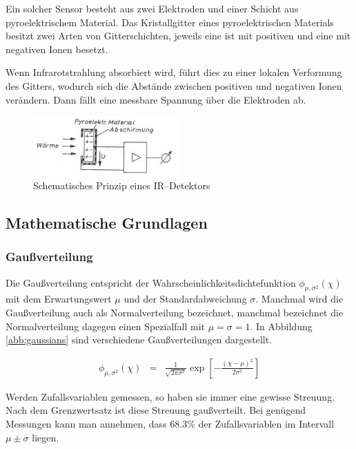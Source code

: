 \documentclass[12pt,a4paper]{scrartcl}
\numberwithin{equation}{section} %
\begin{document}
Ein solcher Sensor besteht aus zwei Elektroden und einer Schicht aus pyroelektrischem Material. Das Kristallgitter eines pyroelektrischen Materials besitzt zwei Arten von Gitterschichten, jeweils eine ist mit positiven und eine mit negativen Ionen besetzt. \cite{pyroelektrischer Sensor}

Wenn Infrarotstrahlung absorbiert wird, führt dies zu einer lokalen Verformung des Gitters, wodurch sich die Abstände zwischen positiven und negativen Ionen verändern. Dann fällt eine messbare Spannung über die Elektroden ab.

\begin{figure}[h!]
  \centering
  \includegraphics[width=0.5\textwidth]{../media/B1.1/IR_Sensor.jpg}
  \caption{Schematisches Prinzip eines IR--Detektors \cite{pyroelektrischer Sensor}}
  \label{abb:pyroelektrischer Sensor}
\end{figure}

\hypertarget{mathematische-grundlagen}{%
\subsection{Mathematische Grundlagen}\label{mathematische-grundlagen}}

\hypertarget{gauuxdfverteilung}{%
\subsubsection{Gaußverteilung}\label{gauuxdfverteilung}}

Die Gaußverteilung entspricht der Wahrscheinlichkeitsdichtefunktion $\phi_{\mu,\sigma^2}(\chi)$ mit dem Erwartungswert $\mu$ und der Standardabweichung $\sigma$. Manchmal wird die Gaußverteilung auch als Normalverteilung bezeichnet, manchmal bezeichnet die Normalverteilung dagegen einen Spezialfall mit $\mu=\sigma=1$. In Abbildung \ref{abb:gaussians} sind verschiedene Gaußverteilungen dargestellt.

\begin{eqnarray}
  \phi_{\mu,\sigma^2}(\chi) &=&
  \frac{1}{\sqrt{2\pi\sigma^2}}
  \exp\left[
  -
  \frac{(\chi - \mu)^2}{2\sigma^2}
  \right]
\end{eqnarray}

\noindent
Werden Zufallsvariablen gemessen, so haben sie immer eine gewisse Streuung. Nach dem Grenzwertsatz ist diese Streuung gaußverteilt. Bei genügend Messungen kann man annehmen, dass $68.3\%$ der Zufallsvariablen im Intervall $\mu\pm\sigma$ liegen.
\end{document}
